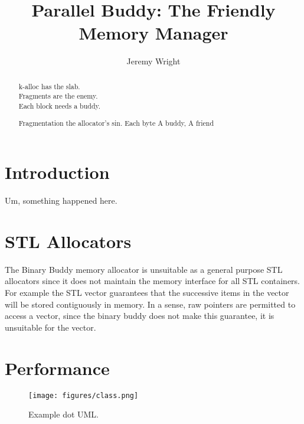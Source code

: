 \documentclass[10pt]{article}
\title{Parallel Buddy: The Friendly Memory Manager}
\author{Jeremy Wright}
\begin{document}
\maketitle

\begin{abstract}
k-alloc has the slab.\\
Fragments are the enemy.\\
Each block needs a buddy.


Fragmentation the
allocator's sin. Each byte
A buddy, A friend
 

\end{abstract}

\section{Introduction}
Um, something happened here.


\section{STL Allocators}
The Binary Buddy memory allocator is unsuitable as a general purpose STL
allocators since it does not maintain the memory interface for all STL
containers. For example the STL vector guarantees that the successive items in
the vector will be stored contiguously in memory. In a sense, raw pointers are
permitted to access a vector, since the binary buddy does not make this
guarantee, it is unsuitable for the vector.

\section{Performance}


\begin{figure*}[h]
\texttt{[image: figures/class.png]}
\caption{Example dot UML.}
\label{fig:example_uml}
\end{figure*}
\end{document}
